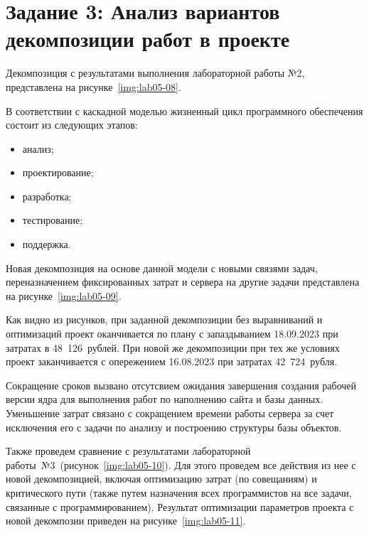 \section{Задание 3: Анализ вариантов декомпозиции работ в проекте}

Декомпозиция с результатами выполнения лабораторной работы №2, представлена на рисунке~\ref{img:lab05-08}.


В соответствии с каскадной моделью жизненный цикл программного обеспечения состоит из следующих этапов:

\begin{itemize}
    \item анализ;
    \item проектирование;
    \item разработка;
    \item тестирование;
    \item поддержка.
\end{itemize}

Новая декомпозиция на основе данной модели с новыми связями задач, переназначением фиксированных затрат и сервера на другие задачи представлена на рисунке~\ref{img:lab05-09}.


Как видно из рисунков, при заданной декомпозиции без выравниваний и оптимизаций проект оканчивается по плану с запаздыванием 18.09.2023 при затратах в 48~126~рублей. При новой же декомпозиции при тех же условиях проект заканчивается с опережением 16.08.2023 при затратах 42~724~рубля.

Сокращение сроков вызвано отсутсвием ожидания завершения создания рабочей версии ядра для выполнения работ по наполнению сайта и базы данных. Уменьшение затрат связано с сокращением времени работы сервера за счет исключения его с задачи по анализу и построению структуры базы объектов.

Также проведем сравнение с результатами лабораторной работы~№3~(рисунок~\ref{img:lab05-10}). Для этого проведем все действия из нее с новой декомпозицией, включая оптимизацию затрат (по совещаниям) и критического пути (также путем назначения всех программистов на все задачи, связанные с программированием). Результат оптимизации параметров проекта с новой декомпозии приведен на рисунке~\ref{img:lab05-11}.


